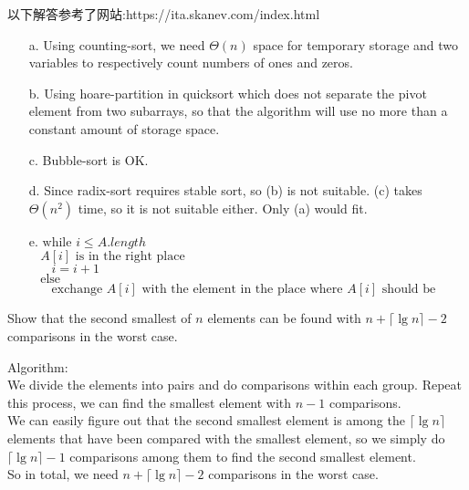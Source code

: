 \documentclass[12pt, a4paper, UTF8]{ctexart}
\begin{document}
\begin{remark}
  以下解答参考了网站:https://ita.skanev.com/index.html
\end{remark}

\begin{solution}
  \begin{itemize}
    \item [a.] Using counting-sort, we need $\Theta(n)$ space for temporary 
      storage and two variables to respectively count numbers of ones and 
      zeros.
    \item [b.] Using hoare-partition in quicksort which does not separate 
      the pivot element from two subarrays, so that the algorithm will use 
      no more than a constant amount of storage space.
    \item [c.] Bubble-sort is OK.
    \item [d.] Since radix-sort requires stable sort, so (b) is not suitable. 
      (c) takes $\Theta(n^{2})$ time, so it is not suitable either. Only 
      (a) would fit.
    \item [e.]
      $\text{while } i\leq A.length$\\
      $~~~~A[i] \text{ is in the right place}$\\
      $~~~~~~~~i = i + 1$\\
      $~~~~\text{else}$\\
      $~~~~~~~~\text{exchange } A[i] \text{ with the element in the place where }
      A[i]\text{ should be}$
  \end{itemize}
\end{solution}

\begin{problem}[TC: 9.1-1]
  Show that the second smallest of $n$ elements can be found with $n + \lceil \lg n\rceil - 2$ 
  comparisons in the worst case.
\end{problem}

\begin{solution}
  Algorithm:\\
  We divide the elements into pairs and do comparisons within each group. Repeat 
  this process, we can find the smallest element with $n - 1$ comparisons.\\
  We can easily figure out that the second smallest element is among the $\lceil\lg n\rceil$ 
  elements that have been compared with the smallest element, so we simply do 
  $\lceil\lg n\rceil - 1$ comparisons among them to find the second smallest element.\\
  So in total, we need $n + \lceil\lg n\rceil - 2$ comparisons in the worst case.
\end{solution}
\end{document}
